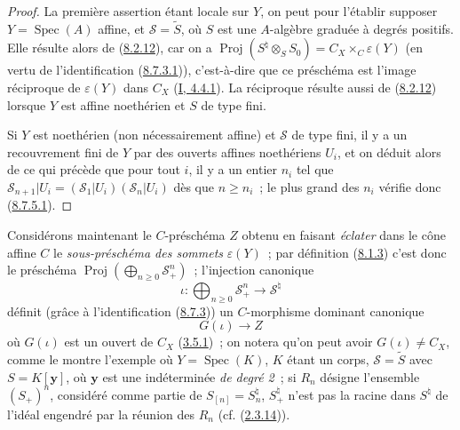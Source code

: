 \begin{proof}
La première assertion étant locale sur $Y$, on peut pour l'établir supposer
$Y=\operatorname{Spec}(A)$ affine, et $\mathcal{S}=\widetilde{S}$, où $S$ est
une $A$-algèbre graduée à degrés positifs. Elle résulte alors de
(\hyperref[II.8.2.12-fr]{8.2.12}), car on a
$\operatorname{Proj}(S^{\natural}\otimes_S S_0)=
C_X\times_C\varepsilon(Y)$ (en vertu de l'identification
(\hyperref[II.8.7.3.1-fr]{8.7.3.1})), c'est-à-dire que ce préschéma est
l'image réciproque de $\varepsilon(Y)$ dans $C_X$
(\hyperref[I.4.4.1-fr]{I, 4.4.1}). La réciproque résulte aussi de
(\hyperref[II.8.2.12-fr]{8.2.12}) lorsque $Y$ est affine noethérien et $S$ de
type fini.

Si $Y$ est noethérien (non nécessairement affine) et $\mathcal{S}$ de type
fini, il y a un recouvrement fini de $Y$ par des ouverts affines noethériens
$U_i$, et on déduit alors de ce qui précède que pour tout $i$, il y a un
entier $n_i$ tel que
$\mathcal{S}_{n+1}|U_i=(\mathcal{S}_1|U_i)(\mathcal{S}_n|U_i)$ dès que
$n\geqslant n_i$~; le plus grand des $n_i$ vérifie donc
(\hyperref[II.8.7.5.1-fr]{8.7.5.1}).
\end{proof}

\begin{env}[8.7.6]
\label{II.8.7.6-fr}
Considérons maintenant le $C$-préschéma $Z$ obtenu en faisant \emph{éclater}
dans le cône affine $C$ le \emph{sous-préschéma des sommets}
$\varepsilon(Y)$~; par définition (\hyperref[II.8.1.3-fr]{8.1.3}) c'est donc
le préschéma
$\operatorname{Proj}(\bigoplus_{n\geqslant 0}\mathcal{S}_+^n)$~; l'injection
canonique
\begin{equation}
\label{II.8.7.6.1-fr}
  \iota:\bigoplus_{n\geqslant 0}\mathcal{S}_+^n
  \longrightarrow\mathcal{S}^{\natural}
\tag{8.7.6.1}
\end{equation}
définit (grâce à l'identification (\hyperref[II.8.7.3-fr]{8.7.3})) un
$C$-morphisme dominant canonique
\begin{equation}
\label{II.8.7.6.2-fr}
  G(\iota)\longrightarrow Z
\tag{8.7.6.2}
\end{equation}
où $G(\iota)$ est un ouvert de $C_X$ (\hyperref[II.3.5.1-fr]{3.5.1})~; on
notera qu'on peut avoir $G(\iota)\ne C_X$, comme le montre l'exemple où
$Y=\operatorname{Spec}(K)$, $K$ étant un corps, $\mathcal{S}=\widetilde{S}$
avec $S=K[\mathbf{y}]$, où $\mathbf{y}$ est une indéterminée \emph{de degré
2}~; si $R_n$ désigne l'ensemble $(S_+)^n$, considéré comme partie de
$S_{[n]}=S_n^{\natural}$, $S_+^{\natural}$ n'est pas la racine dans
$S^{\natural}$ de l'idéal engendré par la réunion des $R_n$ (cf.
(\hyperref[II.2.3.14-fr]{2.3.14})).
\end{env}

